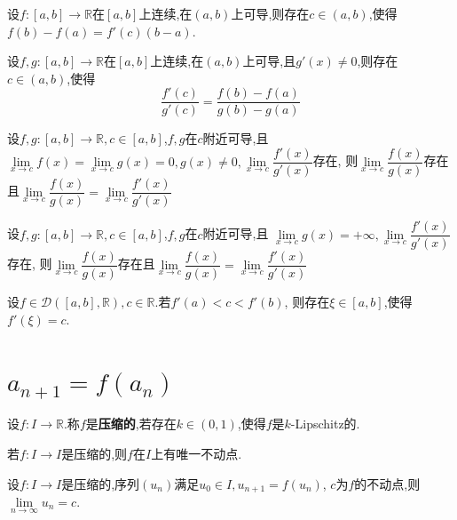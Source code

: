 \begin{thm}[Lagrange]
    设$f:[a,b]\to\mathbb{R}$在$[a,b]$上连续,在$(a,b)$上可导,则存在$c\in(a,b)$,使得$f(b)-f(a)=f'(c)(b-a)$.
\end{thm}

\begin{thm}[Cauchy]
    设$f,g:[a,b]\to\mathbb{R}$在$[a,b]$上连续,在$(a,b)$上可导,且$g'(x) \neq 0$,则存在$c\in(a,b)$,使得
    \[ \dfrac{f'(c)}{g'(c)}=\dfrac{f(b)-f(a)}{g(b)-g(a)} \]
\end{thm}

\begin{thm}[L'Hôpital]
    设$f,g:[a,b]\to\mathbb{R},c\in[a,b]$,$f,g$在$c$附近可导,且
    $\lim\limits_{x\to c}f(x)=\lim\limits_{x\to c}g(x)=0,g(x)\neq0,\lim\limits_{x\to c}\dfrac{f'(x)}{g'(x)}$存在,
    则$\lim\limits_{x\to c}\dfrac{f(x)}{g(x)}$存在且$\lim\limits_{x\to c}\dfrac{f(x)}{g(x)}=\lim\limits_{x\to c}\dfrac{f'(x)}{g'(x)}$
\end{thm}

\begin{thm}[L'Hôpital]
    设$f,g:[a,b]\to\mathbb{R},c\in[a,b]$,$f,g$在$c$附近可导,且
    $\lim\limits_{x\to c}g(x)=+\infty,\lim\limits_{x\to c}\dfrac{f'(x)}{g'(x)}$存在,
    则$\lim\limits_{x\to c}\dfrac{f(x)}{g(x)}$存在且$\lim\limits_{x\to c}\dfrac{f(x)}{g(x)}=\lim\limits_{x\to c}\dfrac{f'(x)}{g'(x)}$
\end{thm}

\begin{thm}[Darboux]
    设$f\in\mathcal{D}([a,b],\mathbb{R}),c\in\mathbb{R}$.若$f'(a)<c<f'(b)$,
    则存在$\xi\in[a,b]$,使得$f'(\xi)=c$.
\end{thm}

\section{$a_{n+1}=f(a_n)$}

\begin{deff}
    设$f:I\to\mathbb{R}$.称$f$是\textbf{压缩的},若存在$k\in(0,1)$,使得$f$是$k$-Lipschitz的.
\end{deff}

\begin{prop}
    若$f:I\to I$是压缩的,则$f$在$I$上有唯一不动点.
\end{prop}

\begin{prop}
    设$f:I\to I$是压缩的,序列$(u_n)$满足$u_0\in I,u_{n+1}=f(u_n)$,
    $c$为$f$的不动点,则$\lim\limits_{n\to\infty}u_n=c$.
\end{prop}

